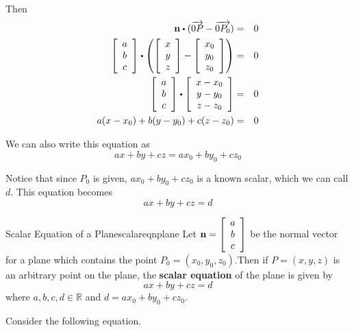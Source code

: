 Then 
\begin{eqnarray*}
\vect{n} \dotprod (\longvect{0P} - \longvect{0P_0}) &=& 0 \\
\leftB
\begin{array}{c}
a \\
b \\
c
\end{array}
\rightB
\dotprod
\left(
\leftB
\begin{array}{c}
x \\
y \\
z
\end{array}
\rightB
-
\leftB
\begin{array}{c}
x_0 \\
y_0 \\
z_0
\end{array}
\rightB
\right) 
&=& 0 \\
\leftB
\begin{array}{c}
a \\
b \\
c
\end{array}
\rightB
\dotprod
\leftB
\begin{array}{c}
x - x_0 \\
y - y_0 \\
z - z_0
\end{array}
\rightB
&=& 0 
\\
a(x - x_0) + b (y - y_0) + c (z-z_0) &=& 0 
\end{eqnarray*}

We can also write this equation as 
\[
ax + by + cz = ax_0 + by_0 + cz_0
\]

Notice that since $P_0$ is given, $ax_0+by_0+cz_0$ is a known scalar, which we can call $d$. This equation becomes
\[
ax + by + cz = d
\]

\begin{definition}{Scalar Equation of a Plane}{scalareqnplane}
Let ${\bf n} = \left[ 
\begin{array}{c}
a \\
b \\
c
\end{array}
\right] $
be the normal vector for a plane which contains the point $P_0 = (x_0, y_0, z_0)$.Then if $P=(x,y,z)$ is an arbitrary point on the plane, the \textbf{scalar equation} of the plane is given by
\[
ax + by + cz = d 
\]
where $ a,b,c,d \in \mathbb{R}$ and $d = ax_0 + by_0 + cz_0$.
\end{definition}

Consider the following equation.

